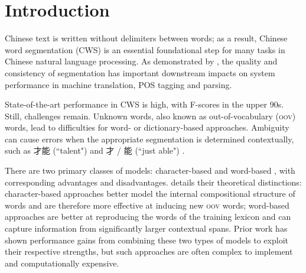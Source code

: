 \section{Introduction}

Chinese text is written without delimiters between words; as a result, Chinese word segmentation (CWS) is an essential foundational step for many tasks in Chinese natural language processing. As demonstrated by \cite{Shi:2007:IJCAI,Bai:2008:IJCNLP,Chang:2008:ACL,Kummerfeld:2013:ACL}, the quality and consistency of segmentation has important downstream impacts on system performance in machine translation, POS tagging and parsing.

State-of-the-art performance in CWS is high, with F-scores in the upper 90s. %
Still, challenges remain. Unknown words, also known as out-of-vocabulary (\textsc{oov}) words, lead to difficulties for word- or dictionary-based approaches.
Ambiguity can cause errors when the appropriate segmentation is determined contextually, such as 才能 (``talent") and 才 / 能 (``just able") \cite{Gao:2003:ACL}.

There are two primary classes of models: character-based \cite{Xue:2003:IJCLCLP,Tseng:2005:SIGHAN,Zhang:2006:HLT-NAACL,Wang:2010:COLING} and word-based \cite{Andrew:2006:EMNLP,Zhang:2007:ACL}, with corresponding advantages and disadvantages.  details their theoretical distinctions: character-based approaches better model the internal compositional structure of words and are therefore more effective at inducing new \textsc{oov} words; word-based approaches are better at reproducing the words of the training lexicon and can capture information from significantly larger contextual spans. Prior work has shown performance gains from combining these two types of models to exploit their respective strengths, but such approaches are often complex to implement and computationally expensive.

